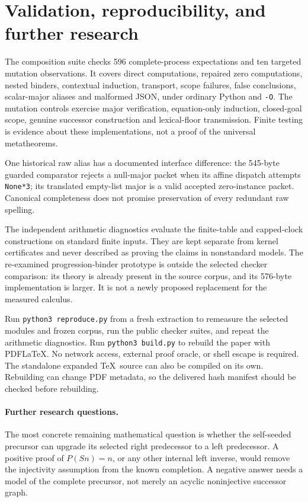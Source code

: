 \section{Validation, reproducibility, and further research}
\label{sec:validation}

The composition suite checks 596 complete-process expectations and ten
targeted mutation observations. It covers direct computations, repaired
zero computations, nested binders, contextual induction, transport,
scope failures, false conclusions, scalar-major aliases and malformed
JSON, under ordinary Python and \texttt{-O}. The mutation controls exercise
major verification, equation-only induction, closed-goal scope, genuine
successor construction and lexical-floor transmission. Finite testing is
evidence about these implementations, not a proof of the universal
metatheorems.

One historical raw alias has a documented interface difference: the
545-byte guarded comparator rejects a null-major packet when its affine
dispatch attempts \texttt{None*3}; its translated empty-list major is a
valid accepted zero-instance packet. Canonical completeness does not
promise preservation of every redundant raw spelling.

The independent arithmetic diagnostics evaluate the finite-table and
capped-clock constructions on standard finite inputs. They are kept
separate from kernel certificates and never described as proving the
claims in nonstandard models. The re-examined progression-binder prototype
is outside the selected checker comparison: its theory is already present
in the source corpus, and its 576-byte implementation is larger. It is not
a newly proposed replacement for the measured calculus.

Run \texttt{python3 reproduce.py} from a fresh extraction to remeasure
the selected modules and frozen corpus, run the public checker suites,
and repeat the arithmetic diagnostics. Run \texttt{python3 build.py}
to rebuild the paper with PDFLaTeX. No network access, external proof
oracle, or shell escape is required. The standalone expanded \TeX\ source
can also be compiled on its own. Rebuilding can change PDF metadata, so
the delivered hash manifest should be checked before rebuilding.

\paragraph{Further research questions.}
The most concrete remaining mathematical question is whether the
self-seeded precursor can upgrade its selected right predecessor to a
left predecessor. A positive proof of $P(Sn)=n$, or any other internal
left inverse, would remove the injectivity assumption from the known
completion. A negative answer needs a model of the complete precursor,
not merely an acyclic noninjective successor graph.

